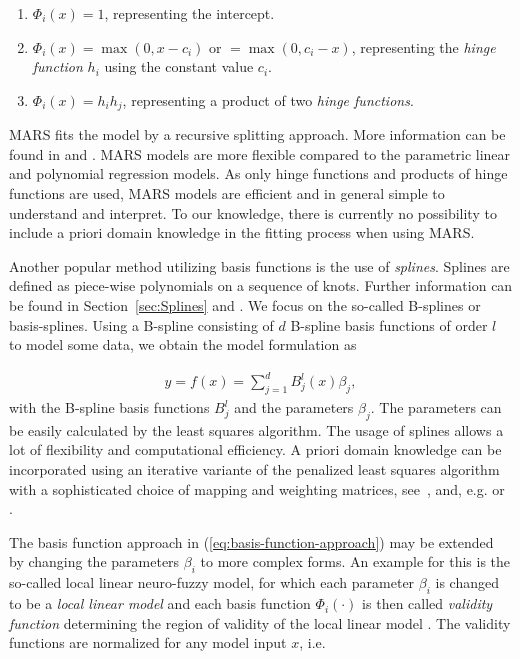 \begin{enumerate}
	\item $\Phi_i(x) = 1$, representing the intercept.
	\item $\Phi_i(x) = \max(0, x - c_i)$ or $= \max(0, c_i - x)$, representing the \emph{hinge function} $h_i$ using the constant value $c_i$.
	\item $\Phi_i(x) = h_i  h_j$, representing a product of two \emph{hinge functions}.
\end{enumerate}
%
MARS fits the model by a recursive splitting approach. More information can be found in \cite{friedman2001elements} and \cite{friedman1991multivariate}. MARS models are more flexible compared to the parametric linear and polynomial regression models. As only hinge functions and products of hinge functions are used, MARS models are efficient and in general simple to understand and interpret. To our knowledge, there is currently no possibility to include a priori domain knowledge in the fitting process when using MARS. 

Another popular method utilizing basis functions is the use of \emph{splines}. Splines are defined as piece-wise polynomials on a sequence of knots. Further information can be found in Section~\ref{sec:Splines} and \cite{deBoor1978practicalGuideToSplines}. We focus on the so-called B-splines or basis-splines. Using a B-spline consisting of $d$ B-spline basis functions of order $l$ to model some data, we obtain the model formulation as

\begin{align} \label{eq:Spline-basis-formulation}
	y = f(x) = \sum_{j=1}^d B_j^l(x) \beta_j, 
\end{align}
%
with the B-spline basis functions $B_j^l$ and the parameters $\beta_j$. The parameters can be easily calculated by the least squares algorithm. The usage of splines allows a lot of flexibility and computational efficiency. A priori domain knowledge can be incorporated using an iterative variante of the penalized least squares algorithm with a sophisticated choice of mapping and weighting matrices, see~, and, e.g. \cite{hofner2011monotonicity} or \cite{bollaerts2006simple}.

The basis function approach in (\ref{eq:basis-function-approach}) may be extended by changing the parameters $\beta_i$ to more complex forms. An example for this is the so-called local linear neuro-fuzzy model, for which each parameter $\beta_i$ is changed to be a \emph{local linear model} and each basis function $\Phi_i(\cdot)$ is then called \emph{validity function} determining the region of validity of the local linear model \cite{nelles2013nonlinear}. The validity functions are normalized for any model input $x$, i.e.

